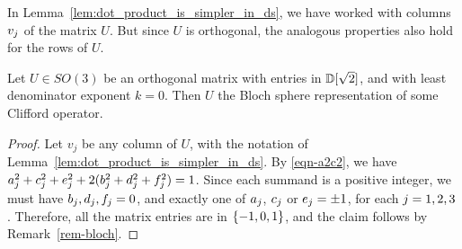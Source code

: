 \begin{remark}
  In Lemma~\ref{lem:dot_product_is_simpler_in_ds}, we have worked with columns $v_j$ of the
  matrix $U$. But since $U$ is orthogonal, the analogous properties also hold for the rows of $U$.
\end{remark}

\begin{lemma}\label{lem:k0-clifford}
  Let $U\in SO(3)$ be an orthogonal matrix with entries in $\mathbb{D}[\sqrt{2}]$, and with least denominator
  exponent $k=0$. Then $U$ the Bloch sphere representation of some Clifford operator.
\end{lemma}

\begin{proof}
  Let $v_j$ be any column of $U$, with the notation of
  Lemma~\ref{lem:dot_product_is_simpler_in_ds}. By {\eqref{eqn-a2c2}}, we have
  $a_j^2+c_j^2+e_j^2+2(b_j^2+d_j^2+f_j^2)=1$. Since each summand is a positive
  integer, we must have $b_j,d_j,f_j = 0$, and exactly one of $a_j$, $c_j$ or
  $e_j=\pm1$, for each $j=1,2,3$. Therefore, all the matrix entries are in $\{-1,0,1\}$, and
  the claim follows by Remark~\ref{rem-bloch}.
\end{proof}

